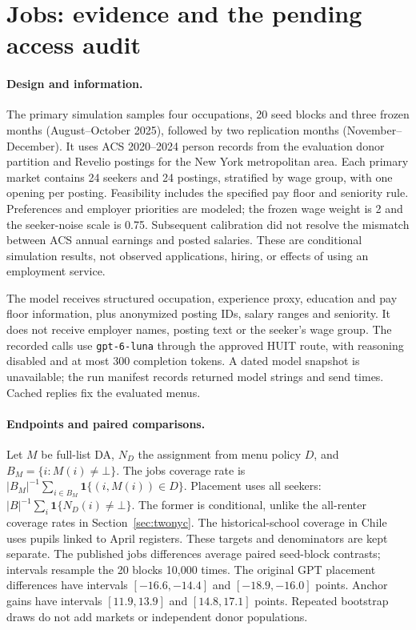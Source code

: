 \section{Jobs: evidence and the pending access audit}\label{app:jobs}
\paragraph{Design and information.}
The primary simulation samples four occupations, 20 seed blocks and three
frozen months (August--October 2025), followed by two replication months
(November--December). It uses ACS 2020--2024 person records from the evaluation
donor partition and Revelio postings for the New York metropolitan area.
Each primary market contains 24 seekers and 24 postings, stratified by wage
group, with one opening per posting. Feasibility includes the specified pay
floor and seniority rule. Preferences and employer priorities are modeled;
the frozen wage weight is 2 and the seeker-noise scale is 0.75. Subsequent
calibration did not resolve the mismatch between ACS annual earnings and
posted salaries. These are conditional simulation results, not observed
applications, hiring, or effects of using an employment service.

The model receives structured occupation, experience proxy, education and pay
floor information, plus anonymized posting IDs, salary ranges and seniority.
It does not receive employer names, posting text or the seeker's wage group.
The recorded calls use \texttt{gpt-6-luna} through the approved HUIT route,
with reasoning disabled and at most 300 completion tokens. A dated model
snapshot is unavailable; the run manifest records returned model strings and
send times. Cached replies fix the evaluated menus.

\paragraph{Endpoints and paired comparisons.}
Let $M$ be full-list DA, $N_D$ the assignment from menu policy $D$, and
$B_M=\{i:M(i)\ne\bot\}$. The jobs coverage rate is
$|B_M|^{-1}\sum_{i\in B_M}\mathbf1\{(i,M(i))\in D\}$.
Placement uses all seekers: $|B|^{-1}\sum_i\mathbf1\{N_D(i)\ne\bot\}$.
The former is conditional, unlike the all-renter coverage rates in
Section~\ref{sec:twonyc}. The historical-school coverage in Chile uses pupils
linked to April registers. These targets and denominators are kept separate.
The published jobs differences average paired seed-block contrasts; intervals
resample the 20 blocks 10,000 times. The original GPT placement differences
have intervals $[-16.6,-14.4]$ and $[-18.9,-16.0]$ points. Anchor gains have
intervals $[11.9,13.9]$ and $[14.8,17.1]$ points. Repeated bootstrap draws
do not add markets or independent donor populations.

